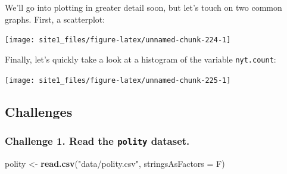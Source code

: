 \documentclass[]{book}
\newenvironment{Shaded}{\begin{snugshade}}{\end{snugshade}}
\newcommand{\KeywordTok}[1]{\textcolor[rgb]{0.13,0.29,0.53}{\textbf{#1}}}
\newcommand{\DataTypeTok}[1]{\textcolor[rgb]{0.13,0.29,0.53}{#1}}
\newcommand{\DecValTok}[1]{\textcolor[rgb]{0.00,0.00,0.81}{#1}}
\newcommand{\StringTok}[1]{\textcolor[rgb]{0.31,0.60,0.02}{#1}}
\newcommand{\OperatorTok}[1]{\textcolor[rgb]{0.81,0.36,0.00}{\textbf{#1}}}
\newcommand{\NormalTok}[1]{#1}
\begin{document}
We'll go into plotting in greater detail soon, but let's touch on two
common graphs. First, a scatterplot:

\begin{Shaded}
\end{Shaded}

\begin{center}\texttt{[image: site1\_files/figure-latex/unnamed-chunk-224-1]} \end{center}

Finally, let's quickly take a look at a histogram of the variable
\texttt{nyt.count}:

\begin{Shaded}
\end{Shaded}

\begin{center}\texttt{[image: site1\_files/figure-latex/unnamed-chunk-225-1]} \end{center}

\subsection{Challenges}\label{challenges-10}

\subsubsection*{\texorpdfstring{Challenge 1. Read the \texttt{polity}
dataset.}{Challenge 1. Read the polity dataset.}}\label{challenge-1.-read-the-polity-dataset.}

\begin{Shaded}
\begin{Highlighting}[]
\NormalTok{polity <-}\StringTok{ }\KeywordTok{read.csv}\NormalTok{(}\StringTok{"data/polity.csv"}\NormalTok{, }\DataTypeTok{stringsAsFactors =}\NormalTok{ F)}
\end{Highlighting}
\end{Shaded}
\end{document}
